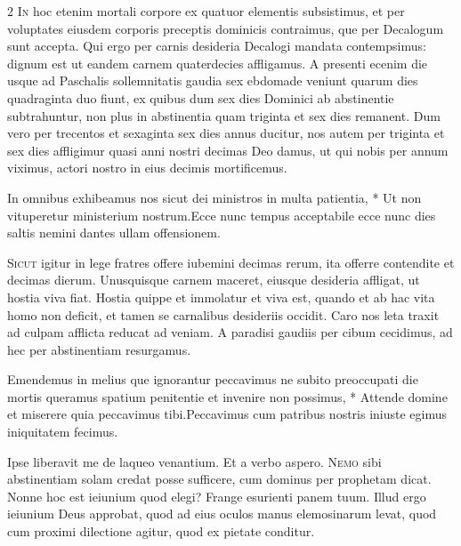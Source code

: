 \begin{multicols*}{2}
\lettrine[lines=2]{\zallmancaps \color{Blue} I}{n} hoc etenim mortali corpore ex quatuor elementis subsistimus, et per voluptates eiusdem corporis preceptis dominicis contraimus, que per Decalogum sunt accepta. Qui ergo per carnis desideria Decalogi mandata contempsimus: dignum est ut eandem carnem quaterdecies affligamus. A presenti ecenim die usque ad Paschalis sollemnitatis gaudia sex ebdomade veniunt quarum dies quadraginta duo fiunt, ex quibus dum sex dies Dominici ab abstinentie subtrahuntur, non plus
in abstinentia quam triginta et sex dies remanent. Dum vero per trecentos et sexaginta sex dies annus ducitur, nos autem per triginta et sex dies affligimur quasi anni nostri decimas Deo damus, ut qui nobis per annum viximus, actori nostro in eius decimis mortificemus.
\begin{responsory}[in-omnibus]
{In omnibus exhibeamus nos sicut dei ministros in multa patientia, * Ut non vituperetur ministerium nostrum.}{Ecce nunc tempus acceptabile ecce nunc dies saltis nemini dantes ullam offensionem.}
\end{responsory}%
\lettrine[lines=2]{\zallmancaps \color{Red} S}{icut} igitur in lege fratres offere iubemini decimas rerum, ita offerre contendite et decimas dierum. Unusquisque carnem maceret, eiusque desideria affligat, ut hostia viva fiat. Hostia quippe et immolatur et viva est, quando et ab hac vita homo non deficit, et tamen se carnalibus desideriis occidit. Caro nos leta traxit ad culpam afflicta reducat ad veniam. A paradisi gaudiis per cibum cecidimus, ad hec per abstinentiam resurgamus.
\begin{responsory-doxology}
{Emendemus in melius que ignorantur peccavimus ne subito preoccupati die mortis queramus spatium penitentie et invenire non possimus, * Attende domine et miserere quia peccavimus tibi.}{Peccavimus cum patribus nostris iniuste egimus iniquitatem fecimus.}
\end{responsory-doxology}%
 \V Ipse liberavit me de laqueo venantium. \R Et a verbo aspero.
\lettrine[lines=2]{\zallmancaps \color{Blue} N}{emo} sibi abstinentiam solam credat posse sufficere, cum dominus per prophetam dicat. Nonne hoc est ieiunium quod elegi? Frange esurienti panem tuum. Illud ergo ieiunium Deus approbat, quod ad eius oculos manus elemosinarum levat, quod cum proximi dilectione agitur, quod ex pietate conditur.

\end{multicols*}
